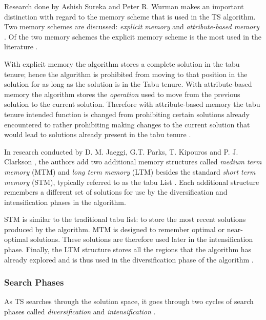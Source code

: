 Research done by Ashish Sureka and Peter R. Wurman makes an important distinction with regard to the memory scheme that is used in the TS algorithm. Two memory schemes are discussed: \emph{explicit memory} and \emph{attribute-based memory} \cite{TabuBiddingStrats,TabuFormGames}. Of the two memory schemes the explicit memory scheme is the most used in the literature \cite{TabuVechicleRoutingWithTimeWindows}.

With explicit memory the algorithm stores a complete solution in the tabu tenure; hence the algorithm is prohibited from moving to that position in the solution for as long as the solution is in the Tabu tenure\cite{TabuBiddingStrats,TabuFormGames}. With attribute-based memory the algorithm stores the \emph{operation} used to move from the previous solution to the current solution\cite{TabuBiddingStrats,TabuFormGames}. Therefore with attribute-based memory the tabu tenure intended function is changed from prohibiting certain solutions already encountered to rather prohibiting making changes to the current solution that would lead to solutions already present in the tabu tenure \cite{TabuBiddingStrats,TabuFormGames}.

In research conducted by D. M. Jaeggi, G.T. Parks, T. Kipouros and P. J. Clarkson \cite{MultiObjTabu}, the authors add two additional memory structures called \emph{medium term memory} (MTM) and \emph{long term memory} (LTM) besides the standard \emph{short term memory} (STM), typically referred to as the tabu List \cite{MultiObjTabu}. Each additional structure remembers a different set of solutions for use by the diversification and intensification phases in the algorithm.

STM is similar to the traditional tabu list: to store the most recent solutions produced by the algorithm. MTM is designed to remember optimal or near-optimal solutions. These solutions are therefore used later in the intensification phase. Finally, the LTM structure stores all the regions that the algorithm has already explored and is thus used in the diversification phase of the algorithm \cite{MultiObjTabu}.

\subsubsection{Search Phases}
As TS searches through the solution space, it goes through two cycles of search phases called \emph{diversification} and \emph{intensification} \cite{TabuParameterization,TabuCrewSchedulingProblem,NonlinearGlobalTabu,SelfControllingReactiveTabu}.

